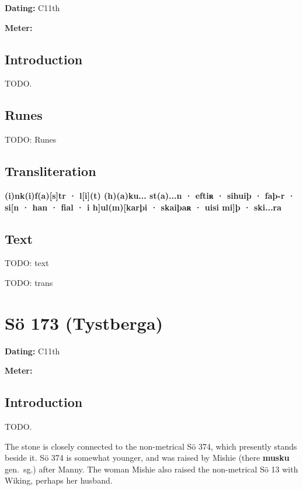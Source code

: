 \begin{flushright}%
\textbf{Dating:} C11th

\textbf{Meter:} \Fornyrdislag
\end{flushright}%

\subsection{Introduction}

TODO.

\subsection{Runes}

TODO: Runes%

\subsection{Transliteration}

\textbf{(i)nk(i)f(a)[s]tr · l[i](t) (h)(a)ku... st(a)...n · eftiʀ · sihuiþ · faþ-r · si[n · han · fial · i h]ul(m)[karþi · skaiþaʀ · uisi mi]þ · ski...ra}

\subsection{Text}

\bpg\bpa[0]%
TODO: text\epa

\bpb TODO: trans\epb\epg

\sectionline\clearpage


\section{Sö 173 (Tystberga)}

\begin{flushright}%
\textbf{Dating:} C11th

\textbf{Meter:} \Fornyrdislag
\end{flushright}%

\subsection{Introduction}

TODO.

The stone is closely connected to the non-metrical Sö 374, which presently stands beside it.  Sö 374 is somewhat younger, and was raised by Mishie (there \textbf{musku} gen.~sg.) after Manny.  The woman Mishie also raised the non-metrical Sö 13 with Wiking, perhaps her husband.


